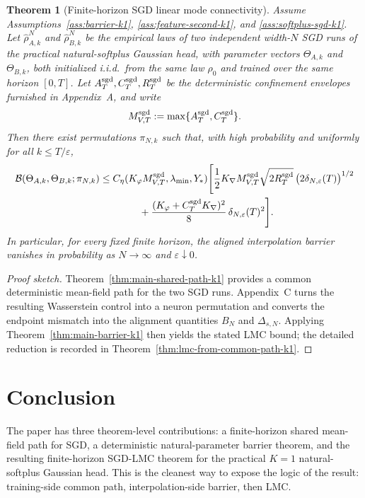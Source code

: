 \documentclass[11pt]{article}
\newtheorem{theorem}{Theorem}
\theoremstyle{definition}
\newcommand{\cB}{\mathcal{B}}
\begin{document}
\begin{theorem}[Finite-horizon SGD linear mode connectivity]
\label{thm:main-sgd-lmc-k1}
Assume Assumptions~\ref{ass:barrier-k1}, \ref{ass:feature-second-k1}, and
\ref{ass:softplus-sgd-k1}. Let $\hat\rho_{A,k}^N$ and $\hat\rho_{B,k}^N$ be the
empirical laws of two independent width-$N$ SGD runs of the practical
natural-softplus Gaussian head, with parameter vectors $\Theta_{A,k}$ and
$\Theta_{B,k}$, both initialized i.i.d.\ from the same law $\rho_0$ and
trained over the same horizon $[0,T]$.
Let
$A_T^{\rm sgd},C_T^{\rm sgd},R_T^{\rm sgd}$ be the deterministic confinement
envelopes furnished in Appendix~A, and write
\[
  M_{V,T}^{\rm sgd}:=\max\{A_T^{\rm sgd},C_T^{\rm sgd}\}.
\]
Then there exist permutations $\pi_{N,k}$ such that, with high probability and
uniformly for all $k\le T/\varepsilon$,
\begin{align}
  \cB(\Theta_{A,k},\Theta_{B,k};\pi_{N,k})
  &\le
  C_\eta(K_\varphi M_{V,T}^{\rm sgd},\lambda_{\min},Y_\ast)
  \Biggl[
    \frac12 K_{\nabla}M_{V,T}^{\rm sgd}\sqrt{2R_T^{\rm sgd}}\,
    \bigl(2\delta_{N,\varepsilon}(T)\bigr)^{1/2}
    \nonumber\\
  &\qquad\qquad
    +
    \frac{(K_\varphi+C_T^{\rm sgd}K_{\nabla})^2}{8}\,
    \delta_{N,\varepsilon}(T)^2
  \Biggr].
  \label{eq:main-sgd-lmc-k1}
\end{align}
In particular, for every fixed finite horizon, the aligned interpolation
barrier vanishes in probability as $N\to\infty$ and $\varepsilon\downarrow 0$.
\end{theorem}

\begin{proof}[Proof sketch]
Theorem~\ref{thm:main-shared-path-k1} provides a common deterministic
mean-field path for the two SGD runs. Appendix~C turns the resulting
Wasserstein control into a neuron permutation and converts the endpoint mismatch
into the alignment quantities $B_N$ and $\Delta_{s,N}$. Applying
Theorem~\ref{thm:main-barrier-k1} then yields the stated LMC bound; the
detailed reduction is recorded in Theorem~\ref{thm:lmc-from-common-path-k1}.
\end{proof}

\section{Conclusion}

The paper has three theorem-level contributions: a finite-horizon shared
mean-field path for SGD, a deterministic natural-parameter barrier theorem, and
the resulting finite-horizon SGD-LMC theorem for the practical $K=1$
natural-softplus Gaussian head. This is the cleanest way to expose the logic of
the result: training-side common path, interpolation-side barrier, then LMC.
\end{document}
